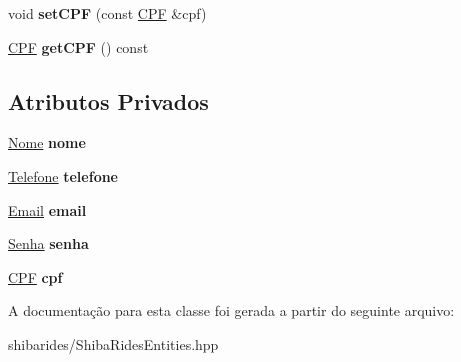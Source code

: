 \begin{DoxyCompactItemize}
\item 
void {\bfseries set\+C\+PF} (const \hyperlink{classshibarides_1_1CPF}{C\+PF} \&cpf)\hypertarget{classshibarides_1_1Usuario_ad22e4cf193a09a935b33ee6bc1b5102d}{}\label{classshibarides_1_1Usuario_ad22e4cf193a09a935b33ee6bc1b5102d}

\item 
\hyperlink{classshibarides_1_1CPF}{C\+PF} {\bfseries get\+C\+PF} () const \hypertarget{classshibarides_1_1Usuario_a9710f4d8e7c3ae151ee45f164a147b0c}{}\label{classshibarides_1_1Usuario_a9710f4d8e7c3ae151ee45f164a147b0c}

\end{DoxyCompactItemize}
\subsection*{Atributos Privados}
\begin{DoxyCompactItemize}
\item 
\hyperlink{classshibarides_1_1Nome}{Nome} {\bfseries nome}\hypertarget{classshibarides_1_1Usuario_a4a46b7e57b2d6326c109fe66126bfa46}{}\label{classshibarides_1_1Usuario_a4a46b7e57b2d6326c109fe66126bfa46}

\item 
\hyperlink{classshibarides_1_1Telefone}{Telefone} {\bfseries telefone}\hypertarget{classshibarides_1_1Usuario_a20bb9c94cf617afd44aa581a05c868bf}{}\label{classshibarides_1_1Usuario_a20bb9c94cf617afd44aa581a05c868bf}

\item 
\hyperlink{classshibarides_1_1Email}{Email} {\bfseries email}\hypertarget{classshibarides_1_1Usuario_a0ef5eb97055777068fea14380ca2b3c9}{}\label{classshibarides_1_1Usuario_a0ef5eb97055777068fea14380ca2b3c9}

\item 
\hyperlink{classshibarides_1_1Senha}{Senha} {\bfseries senha}\hypertarget{classshibarides_1_1Usuario_a4759f2777cbcbcd253b51018675dd02e}{}\label{classshibarides_1_1Usuario_a4759f2777cbcbcd253b51018675dd02e}

\item 
\hyperlink{classshibarides_1_1CPF}{C\+PF} {\bfseries cpf}\hypertarget{classshibarides_1_1Usuario_a30438f56fbd5fb38fa347c605f2fcf5a}{}\label{classshibarides_1_1Usuario_a30438f56fbd5fb38fa347c605f2fcf5a}

\end{DoxyCompactItemize}


A documentação para esta classe foi gerada a partir do seguinte arquivo\+:\begin{DoxyCompactItemize}
\item 
shibarides/Shiba\+Rides\+Entities.\+hpp\end{DoxyCompactItemize}
